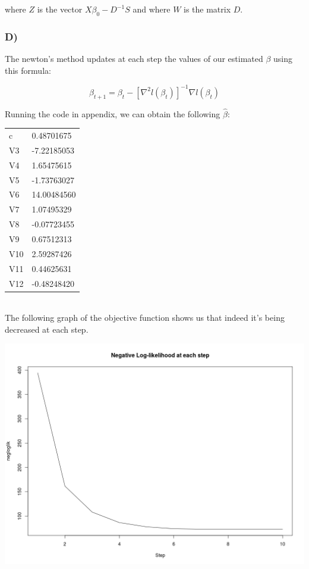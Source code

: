 \documentclass{article}
\begin{document}
where $Z$ is the vector $X\beta_0-D^{-1}S$ and where $W$ is the matrix $D$.

\subsubsection*{D)}

The newton's method updates at each step the values of our estimated $\beta$ using this formula:

\begin{equation*}
\beta_{t+1}=\beta_t-[\nabla^2 l(\beta_t)]^{-1}\nabla l(\beta_t)
\end{equation*}

Running the code in appendix, we can obtain the following $\hat{\beta}$:\\

\begin{tabular}{ll}
c   & 0.48701675\\
V3  &-7.22185053\\
V4  & 1.65475615\\
V5  &-1.73763027\\
V6  &14.00484560\\
V7  & 1.07495329\\
V8  &-0.07723455\\
V9  & 0.67512313\\
V10 & 2.59287426\\
V11 & 0.44625631\\
V12 &-0.48248420
\end{tabular}\\

The following graph of the objective function shows us that indeed it's being decreased at each step.

\includegraphics[width=\textwidth]{Rplot_newton.png}
\end{document}
